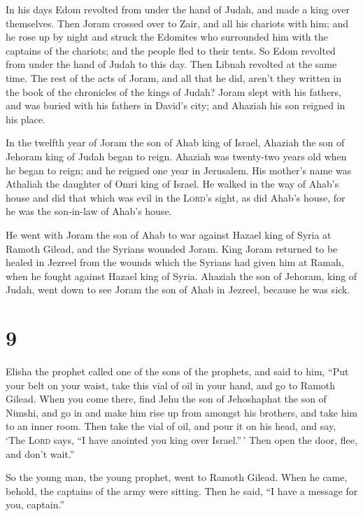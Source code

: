  In his days Edom revolted from under the hand of Judah,
and made a king over themselves.  Then Joram crossed over
to Zair, and all his chariots with him; and he rose up by night and
struck the Edomites who surrounded him with the captains of the
chariots; and the people fled to their tents.  So Edom
revolted from under the hand of Judah to this day. Then Libnah revolted
at the same time.  The rest of the acts of Joram, and all
that he did, aren't they written in the book of the chronicles of the
kings of Judah?  Joram slept with his fathers, and was
buried with his fathers in David's city; and Ahaziah his son reigned in
his place.

 In the twelfth year of Joram the son of Ahab king of
Israel, Ahaziah the son of Jehoram king of Judah began to reign.
 Ahaziah was twenty-two years old when he began to reign;
and he reigned one year in Jerusalem. His mother's name was Athaliah the
daughter of Omri king of Israel.  He walked in the way of
Ahab's house and did that which was evil in the \textsc{Lord}'s sight,
as did Ahab's house, for he was the son-in-law of Ahab's house.

 He went with Joram the son of Ahab to war against Hazael
king of Syria at Ramoth Gilead, and the Syrians wounded Joram.
 King Joram returned to be healed in Jezreel from the
wounds which the Syrians had given him at Ramah, when he fought against
Hazael king of Syria. Ahaziah the son of Jehoram, king of Judah, went
down to see Joram the son of Ahab in Jezreel, because he was sick.

\hypertarget{section-8}{%
\section{9}\label{section-8}}

 Elisha the prophet called one of the sons of the
prophets, and said to him, ``Put your belt on your waist, take this vial
of oil in your hand, and go to Ramoth Gilead.  When you
come there, find Jehu the son of Jehoshaphat the son of Nimshi, and go
in and make him rise up from amongst his brothers, and take him to an
inner room.  Then take the vial of oil, and pour it on his
head, and say, `The \textsc{Lord} says, ``I have anointed you king over
Israel.''\,' Then open the door, flee, and don't wait.''

 So the young man, the young prophet, went to Ramoth
Gilead.  When he came, behold, the captains of the army
were sitting. Then he said, ``I have a message for you, captain.''

